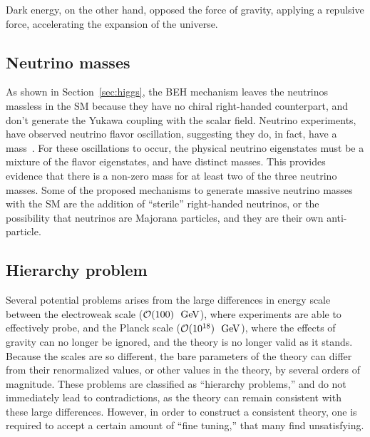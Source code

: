 Dark energy, on the other hand, opposed the force of gravity, applying a
repulsive force, accelerating the expansion of the universe.

\FloatBarrier
\subsection{Neutrino masses}

As shown in Section~\ref{sec:higgs}, the BEH mechanism leaves the neutrinos
massless in the SM because they have no chiral right-handed counterpart, and
don't generate the Yukawa coupling with the scalar field.
Neutrino experiments, have observed neutrino flavor oscillation, suggesting
they do, in fact, have a mass~\cite{PhysRevD.86.010001}.
For these oscillations to occur, the physical neutrino eigenstates must be
a mixture of the flavor eigenstates, and have distinct masses.
This provides evidence that there is a non-zero mass for at least two of the
three neutrino masses.
Some of the proposed mechanisms to generate massive neutrino masses with the
SM are the addition of ``sterile'' right-handed neutrinos, or the possibility
that neutrinos are Majorana particles, and they are their own anti-particle.

\FloatBarrier
\subsection{Hierarchy problem}

Several potential problems arises from the large differences in energy scale
between the electroweak scale ($\mathcal{O}(100)~\GeV$), where experiments are
able to effectively probe, and the Planck scale ($\mathcal{O}(10^{18})~\GeV$),
where the effects of gravity can no longer be ignored, and the theory is no
longer valid as it stands.
Because the scales are so different, the bare parameters of the theory can
differ from their renormalized values, or other values in the theory,
by several orders of magnitude.
These problems are classified as ``hierarchy problems,'' and do not immediately
lead to contradictions, as the theory can remain consistent with these large
differences.
However, in order to construct a consistent theory, one is required to accept
a certain amount of ``fine tuning,'' that many find unsatisfying.

